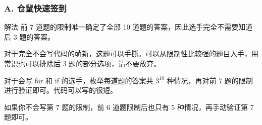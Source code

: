 \renewcommand{\problemname}{A. 仓鼠快速签到}

\begin{frame}\frametitle{\problemname}
	\begin{block}{解法}
		前 7 道题的限制唯一确定了全部 10 道题的答案，因此选手完全不需要知道后 3 题的答案。

		对于完全不会写代码的萌新，这题可以手撕。可以从限制性比较强的题目入手，用常识也可以排除后 3 题的部分选项，请不要放弃。

		对于会写 for 和 if 的选手，枚举每道题的答案共 $3^{10}$ 种情况，再对前 7 题的限制进行验证即可。代码可以写的很短。

		如果你不会写第 7 题的限制，前 6 道题限制后也只有 5 种情况，再手动验证第 7 题即可。
	\end{block}
\end{frame}
